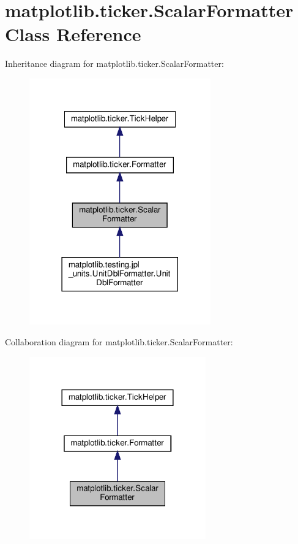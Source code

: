 \hypertarget{classmatplotlib_1_1ticker_1_1ScalarFormatter}{}\section{matplotlib.\+ticker.\+Scalar\+Formatter Class Reference}
\label{classmatplotlib_1_1ticker_1_1ScalarFormatter}


Inheritance diagram for matplotlib.\+ticker.\+Scalar\+Formatter\+:
\nopagebreak
\begin{figure}[H]
\begin{center}
\leavevmode
\includegraphics[width=222pt]{classmatplotlib_1_1ticker_1_1ScalarFormatter__inherit__graph}
\end{center}
\end{figure}


Collaboration diagram for matplotlib.\+ticker.\+Scalar\+Formatter\+:
\nopagebreak
\begin{figure}[H]
\begin{center}
\leavevmode
\includegraphics[width=216pt]{classmatplotlib_1_1ticker_1_1ScalarFormatter__coll__graph}
\end{center}
\end{figure}
